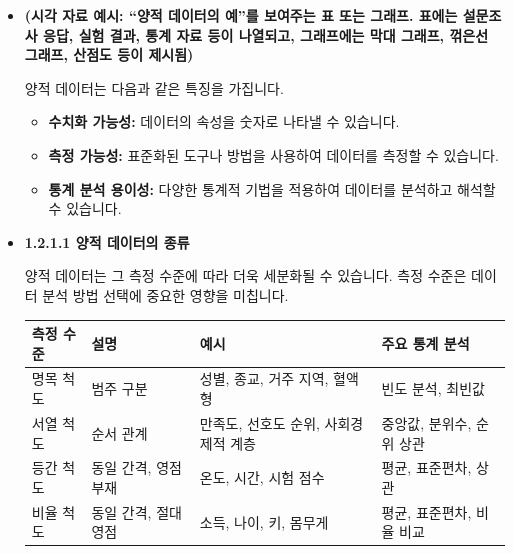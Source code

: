 \documentclass[
  letterpaper,
]{book}
\providecommand{\tightlist}{%
  \setlength{\itemsep}{0pt}\setlength{\parskip}{0pt}}
\begin{document}
\begin{itemize}
\item
  \textbf{(시각 자료 예시: ``양적 데이터의 예''를 보여주는 표 또는
  그래프. 표에는 설문조사 응답, 실험 결과, 통계 자료 등이 나열되고,
  그래프에는 막대 그래프, 꺾은선 그래프, 산점도 등이 제시됨)}

  양적 데이터는 다음과 같은 특징을 가집니다.

  \begin{itemize}
  \tightlist
  \item
    \textbf{수치화 가능성:} 데이터의 속성을 숫자로 나타낼 수 있습니다.
  \item
    \textbf{측정 가능성:} 표준화된 도구나 방법을 사용하여 데이터를
    측정할 수 있습니다.
  \item
    \textbf{통계 분석 용이성:} 다양한 통계적 기법을 적용하여 데이터를
    분석하고 해석할 수 있습니다.
  \end{itemize}
\item
  \textbf{1.2.1.1 양적 데이터의 종류}

  양적 데이터는 그 측정 수준에 따라 더욱 세분화될 수 있습니다. 측정
  수준은 데이터 분석 방법 선택에 중요한 영향을 미칩니다.

  \begin{longtable}[]{@{}
    >{\centering\arraybackslash}p{}
    >{\centering\arraybackslash}p{}
    >{\centering\arraybackslash}p{}
    >{\centering\arraybackslash}p{}@{}}
  \toprule\noalign{}
  \begin{minipage}[b]{\linewidth}\centering
  측정 수준
  \end{minipage} & \begin{minipage}[b]{\linewidth}\centering
  설명
  \end{minipage} & \begin{minipage}[b]{\linewidth}\centering
  예시
  \end{minipage} & \begin{minipage}[b]{\linewidth}\centering
  주요 통계 분석
  \end{minipage} \\
  \midrule\noalign{}
  \endhead
  \bottomrule\noalign{}
  \endlastfoot
  명목 척도 & 범주 구분 & 성별, 종교, 거주 지역, 혈액형 & 빈도 분석,
  최빈값 \\
  서열 척도 & 순서 관계 & 만족도, 선호도 순위, 사회경제적 계층 & 중앙값,
  분위수, 순위 상관 \\
  등간 척도 & 동일 간격, 영점 부재 & 온도, 시간, 시험 점수 & 평균,
  표준편차, 상관 \\
  비율 척도 & 동일 간격, 절대 영점 & 소득, 나이, 키, 몸무게 & 평균,
  표준편차, 비율 비교 \\
  \end{longtable}


\end{itemize}
\end{document}
